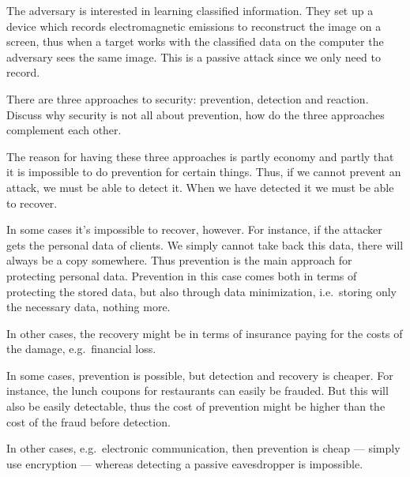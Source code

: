 \begin{frame}
  \begin{solution}
    The adversary is interested in learning classified information.
    They set up a device which records electromagnetic emissions to reconstruct 
    the image on a screen, thus when a target works with the classified data on 
    the computer the adversary sees the same image.
    This is a passive attack since we only need to record.
  \end{solution}
\end{frame}


\begin{frame}
  \begin{exercise}
    There are three approaches to security: prevention, detection and reaction.
    Discuss why security is not all about prevention, how do the three approaches 
    complement each other.
  \end{exercise}
\end{frame}

\begin{frame}
  \begin{solution}
    The reason for having these three approaches is partly economy and partly 
    that it is impossible to do prevention for certain things.
    Thus, if we cannot prevent an attack, we must be able to detect it.
    When we have detected it we must be able to recover.

    In some cases it's impossible to recover, however.
    For instance, if the attacker gets the personal data of clients.
    We simply cannot take back this data, there will always be a copy somewhere.
    Thus prevention is the main approach for protecting personal data.
    Prevention in this case comes both in terms of protecting the stored data, 
    but also through data minimization, i.e.\ storing only the necessary data, 
    nothing more.

    In other cases, the recovery might be in terms of insurance paying for the 
    costs of the damage, e.g.\ financial loss.

    In some cases, prevention is possible, but detection and recovery is 
    cheaper.
    For instance, the lunch coupons for restaurants can easily be frauded.
    But this will also be easily detectable, thus the cost of prevention might 
    be higher than the cost of the fraud before detection.

    In other cases, e.g.\ electronic communication, then prevention is cheap --- 
    simply use encryption --- whereas detecting a passive eavesdropper is 
    impossible.
  \end{solution}
\end{frame}


